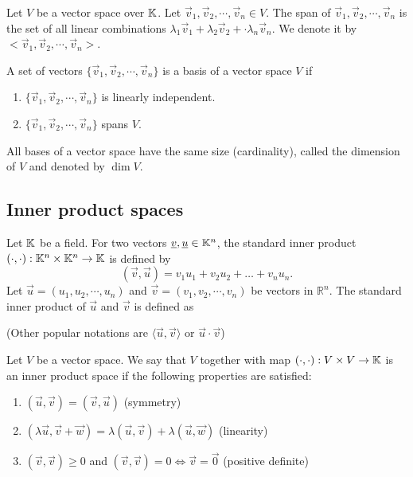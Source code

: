 \begin{definition}[Span]
    Let $V$ be a vector space over $\mathbb{K}$. Let $\vec{v}_1, \vec{v}_2, \cdots, \vec{v}_n \in V$. The span of $\vec{v}_1, \vec{v}_2, \cdots, \vec{v}_n$ is the set of all linear combinations
    $\lambda_1\vec{v}_1 + \lambda_2\vec{v}_2 + \cdot \lambda_n\vec{v}_n$. We denote it by $<\vec{v}_1, \vec{v}_2, \cdots, \vec{v}_n>$.
\end{definition}

\begin{definition}[Bases]
    A set of vectors $\{\vec{v}_1, \vec{v}_2, \cdots, \vec{v}_n\}$ is a basis of a vector space $V$ if
    \begin{enumerate}
        \item $\{\vec{v}_1, \vec{v}_2, \cdots, \vec{v}_n\}$ is linearly independent.
        \item $\{\vec{v}_1, \vec{v}_2, \cdots, \vec{v}_n\}$ spans $V$.
    \end{enumerate}
\end{definition}

\begin{definition}[Dimension]
    All bases of a vector space have the same size (cardinality), called the dimension of $V$ and denoted by $\dim V$.
\end{definition}

\subsection{Inner product spaces}
\begin{definition}
    Let $\mathbb{K}$ be a field. For two vectors $\underline{v}, \underline{u} \in \mathbb{K}^n$, the standard inner product $(\cdot, \cdot): \mathbb{K}^n \times \mathbb{K}^n \to \mathbb{K}$ is defined by
    $$(\vec{v}, \vec{u}) = v_1u_1 + v_2u_2 + \dots + v_nu_n.$$
    Let $\vec{u} = (u_1, u_2, \cdots, u_n)$ and $\vec{v} = (v_1, v_2, \cdots, v_n)$ be vectors in $\mathbb{R}^n$. The standard inner product of $\vec{u}$ and $\vec{v}$ is defined as

    (Other popular notations are $\langle \vec{u}, \vec{v} \rangle$ or $\vec{u} \cdot \vec{v}$)
\end{definition}

\begin{definition}
    Let $V$ be a vector space. We say that $V$ together with map $(\cdot, \cdot): V \times V \to \mathbb{K}$ is an inner product space if the following properties are satisfied:
    \begin{enumerate}
        \item $(\vec{u},\vec{v}) = (\vec{v}, \vec{u})$ \hfill (symmetry)
        \item $(\lambda\vec{u}, \vec{v} + \vec{w}) = \lambda(\vec{u}, \vec{v}) + \lambda(\vec{u}, \vec{w})$ \hfill (linearity)
        \item $(\vec{v}, \vec{v}) \ge 0$ and $(\vec{v},\vec{v}) = 0 \iff \vec{v} = \vec{0}$ \hfill (positive definite)
    \end{enumerate}
\end{definition}

